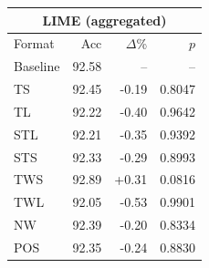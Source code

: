 \begin{tabular}{lrrr}
\toprule
\multicolumn{4}{c}{\textbf{LIME (aggregated)}} \\
\midrule
Format & Acc & $\Delta$\% & $p$ \\
\midrule
Baseline & 92.58 & -- & -- \\
\midrule
TS & 92.45 & -0.19 & 0.8047 \\
TL & 92.22 & -0.40 & 0.9642 \\
STL & 92.21 & -0.35 & 0.9392 \\
STS & 92.33 & -0.29 & 0.8993 \\
TWS & 92.89 & +0.31 & 0.0816 \\
TWL & 92.05 & -0.53 & 0.9901 \\
NW & 92.39 & -0.20 & 0.8334 \\
POS & 92.35 & -0.24 & 0.8830 \\
\bottomrule
\end{tabular}